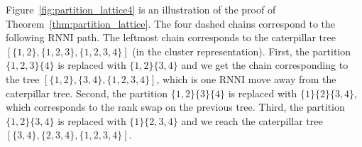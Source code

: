 \documentclass[11pt]{amsart}
\newcommand{\rnni}{\mathrm{RNNI}}
\begin{document}
Figure~\ref{fig:partition_lattice4} is an illustration of the proof of Theorem~\ref{thm:partition_lattice}.
The four dashed chains correspond to the following $\rnni$ path.
The leftmost chain corresponds to the caterpillar tree $[\{1, 2\}, \{1, 2, 3\}, \{1, 2, 3, 4\}]$ (in the cluster representation).
First, the partition $\{1, 2, 3\} \{4\}$ is replaced with $\{1, 2\} \{3, 4\}$ and we get the chain corresponding to the tree $[\{1, 2\}, \{3, 4\}, \{1, 2, 3, 4\}]$, which is one $\rnni$ move away from the caterpillar tree.
Second, the partition $\{1, 2\} \{3\} \{4\}$ is replaced with $\{1\} \{2\} \{3, 4\}$, which corresponds to the rank swap on the previous tree.
Third, the partition $\{1, 2\} \{3, 4\}$ is replaced with $\{1\} \{2, 3, 4\}$ and we reach the caterpillar tree $[\{3,4\}, \{2, 3, 4\}, \{1, 2, 3, 4\}]$.
\end{document}
